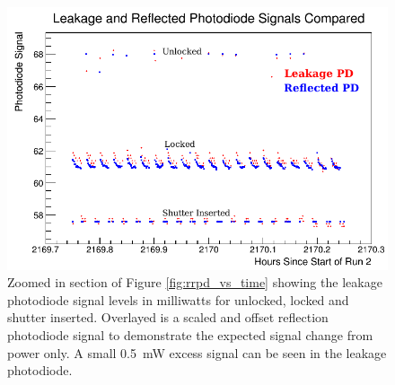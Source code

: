 \begin{figure}
\centering
\includegraphics[width=5in]{./Pictures/RPD_RRPD_overlay.png}
\caption{\label{fig:rpd_rrpd_overlay}Zoomed in section of Figure \ref{fig:rrpd_vs_time} showing the leakage photodiode signal levels in milliwatts for unlocked, locked and shutter inserted. Overlayed is a scaled and offset reflection photodiode signal to demonstrate the expected signal change from power only. A small 0.5~mW excess signal can be seen in the leakage photodiode. }
\end{figure}

